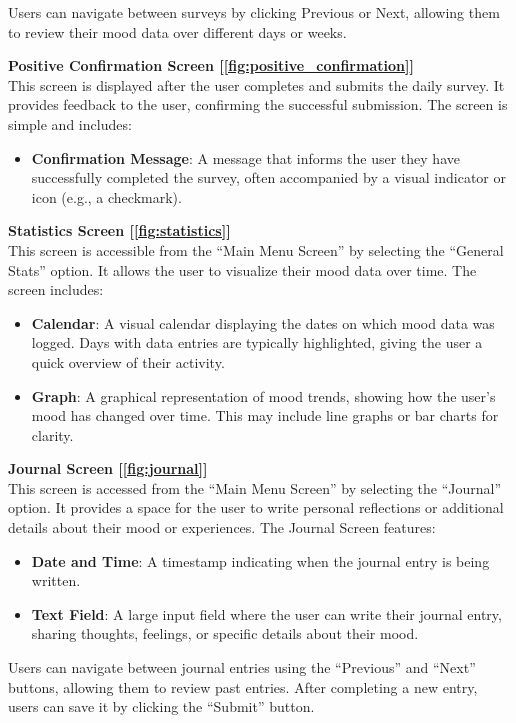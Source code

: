 \noindent Users can navigate between surveys by clicking Previous or Next, allowing them to review their mood data over different days or weeks.

\vspace{5mm}

\noindent \textbf{Positive Confirmation Screen [\ref{fig:positive_confirmation}]} \\
This screen is displayed after the user completes and submits the daily survey. It provides feedback to the user, confirming the successful submission. The screen is simple and includes:
\begin{itemize}
    \item \textbf{Confirmation Message}: A message that informs the user they have successfully completed the survey, often accompanied by a visual indicator or icon (e.g., a checkmark).
\end{itemize}

\vspace{5mm}

\noindent \textbf{Statistics Screen [\ref{fig:statistics}]} \\
This screen is accessible from the ``Main Menu Screen'' by selecting the ``General Stats'' option. It allows the user to visualize their mood data over time. The screen includes:
\begin{itemize}
    \item \textbf{Calendar}: A visual calendar displaying the dates on which mood data was logged. Days with data entries are typically highlighted, giving the user a quick overview of their activity.
    \item \textbf{Graph}: A graphical representation of mood trends, showing how the user's mood has changed over time. This may include line graphs or bar charts for clarity.
\end{itemize}

\vspace{5mm}

\noindent \textbf{Journal Screen [\ref{fig:journal}]} \\
This screen is accessed from the ``Main Menu Screen'' by selecting the ``Journal'' option. It provides a space for the user to write personal reflections or additional details about their mood or experiences. The Journal Screen features:
\begin{itemize}
    \item \textbf{Date and Time}: A timestamp indicating when the journal entry is being written.
    \item \textbf{Text Field}: A large input field where the user can write their journal entry, sharing thoughts, feelings, or specific details about their mood.
\end{itemize}
\noindent Users can navigate between journal entries using the ``Previous'' and ``Next'' buttons, allowing them to review past entries. After completing a new entry, users can save it by clicking the ``Submit'' button.

